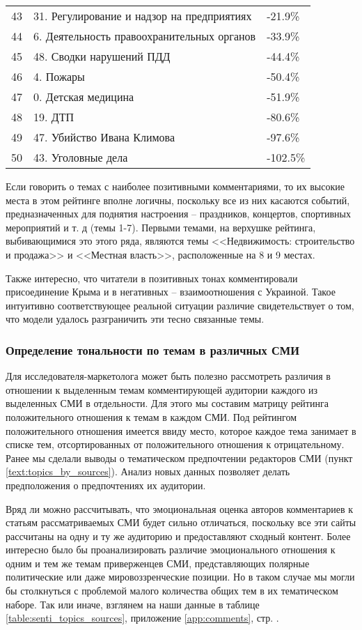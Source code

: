 \begin{longtable}[c]{| L{3cm} | C{7cm} | R{5cm} |}
		43 & 31. Регулирование и надзор на предприятиях & -21.9\% \\
		44 & 6. Деятельность правоохранительных органов & -33.9\% \\
		45 & 48. Сводки нарушений ПДД & -44.4\% \\
		46 & 4. Пожары & -50.4\% \\
		47 & 0. Детская медицина & -51.9\% \\
		48 & 19. ДТП & -80.6\% \\
		49 & 47. Убийство Ивана Климова & -97.6\% \\
		50 & 43. Уголовные дела & -102.5\% \\
	\hline
\end{longtable}
Если говорить о темах с наиболее позитивными комментариями, то их высокие места в этом рейтинге вполне логичны, поскольку все из них касаются событий, предназначенных для поднятия настроения -- праздников, концертов, спортивных мероприятий и т. д (темы 1-7). Первыми темами, на верхушке рейтинга, выбивающимися это этого ряда, являются темы <<Недвижимость: строительство и продажа>> и <<Местная власть>>, расположенные на 8 и 9 местах.

Также интересно, что читатели в позитивных тонах комментировали присоединение Крыма и в негативных -- взаимоотношения с Украиной. Такое интуитивно соответствующее реальной ситуации различие свидетельствует о том, что модели удалось разграничить эти тесно связанные темы.

\subsubsection{Определение тональности по темам в различных СМИ}
Для исследователя-маркетолога может быть полезно рассмотреть различия в отношении к выделенным темам комментирующей аудитории каждого из выделенных СМИ в отдельности. Для этого мы составим матрицу рейтинга положительного отношения к темам в каждом СМИ. Под рейтингом положительного отношения имеется ввиду место, которое каждое тема занимает в списке тем, отсортированных от положительного отношения к отрицательному. Ранее мы сделали выводы о тематическом предпочтении редакторов СМИ (пункт \ref{text:topics_by_sources}). Анализ новых данных позволяет делать предположения о предпочтениях их аудитории.

Вряд ли можно рассчитывать, что эмоциональная оценка авторов комментариев к статьям рассматриваемых СМИ будет сильно отличаться, поскольку все эти сайты рассчитаны на одну и ту же аудиторию и предоставляют сходный контент. Более интересно было бы проанализировать различие эмоционального отношения к одним и тем же темам приверженцев СМИ, представляющих полярные политические или даже мировоззренческие позиции. Но в таком случае мы могли бы столкнуться с проблемой малого количества общих тем в их тематическом наборе. Так или иначе, взглянем на наши данные в таблице \ref{table:senti_topics_sources}, приложение \ref{app:comments}, стр. \pageref{table:senti_topics_sources}.

